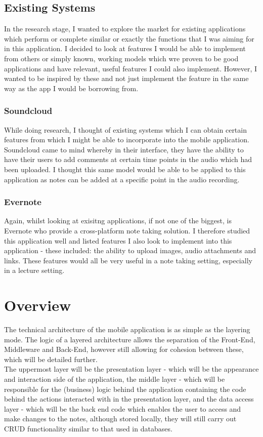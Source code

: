 \documentclass{report}
\begin{document}
		\subsection{Existing Systems}
In the research stage, I wanted to explore the market for existing applications which perform or complete similar or exactly the functions that I was aiming for in this application. I decided to look at features I would be able to implement from others or simply known, working models which wre proven to be good applications and have relevant, useful features I could also implement. However, I wanted to be inspired by these and not just implement the feature in the same way as the app I would be borrowing from.
			\subsubsection{Soundcloud}\cite{Soundcloud}
While doing research, I thought of existing systems which I can obtain certain features from which I might be able to incorporate into the mobile application. Soundcloud came to mind whereby in their interface, they have the ability to have their users to add comments at certain time points in the audio which had been uploaded. I thought this same model would be able to be applied to this application as notes can be added at a specific point in the audio recording.
			\subsubsection{Evernote}
Again, whilst looking at exisitng applications, if not one of the biggest, is Evernote who provide a cross-platform note taking solution. I therefore studied this application well and listed features I also look to implement into this application - these included: the ability to upload images, audio attachments and links. These features would all be very useful in a note taking setting, especially in a lecture setting.

	\section{Overview}
The technical architecture of the mobile application is as simple as the layering mode. The logic of a layered architecture allows the separation of the Front-End, Middleware and Back-End, however still allowing for cohesion between these, which will be detailed further.\\

The uppermost layer will be the presentation layer - which will be the appearance and interaction side of the application, the middle layer - which will be responsible for the (business) logic behind the application containing the code behind the actions interacted with in the presentation layer, and the data access layer - which will be the back end code which enables the user to access and make changes to the notes, although stored locally, they will still carry out CRUD functionality similar to that used in databases.
\end{document}
